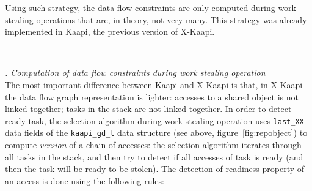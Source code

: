 \documentclass[12pt]{report}
\newcommand{\kaapi}{\textsc{X}-Kaapi\xspace}
\renewcommand{\subsubsection}[1]{~\\ \addtocounter{subsubsection}{1} \noindent\textit{
\thesubsubsection. #1\\}}
\begin{document}
Using such strategy, the data flow constraints are only computed during work stealing operations that are, in theory, not very many. This strategy was already implemented in Kaapi, the previous version of \kaapi.

\subsubsection{Computation of data flow constraints during work stealing operation}
The most important difference between Kaapi and \kaapi is that, in \kaapi the data flow graph representation is lighter: accesses to a shared object is not linked together; tasks in the stack are not linked together.
In order to detect ready task, the selection algorithm during work stealing operation uses \verb+last_XX+ data fields of the \verb+kaapi_gd_t+ data structure (see above, figure~\ref{fig:repobject}) to compute \textit{version} of a chain of accesses:
the selection algorithm iterates through all tasks in the stack, and then try to detect if all accesses of task is ready (and then the task will be ready to be stolen). The detection of readiness property of an access is done using the following rules:
\end{document}
